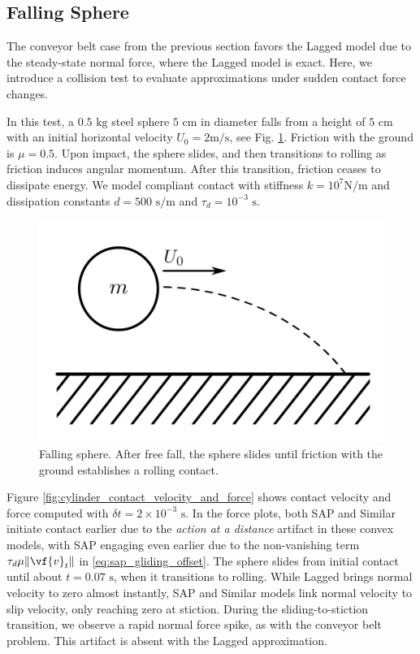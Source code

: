 \subsection{Falling Sphere}
\label{sec:falling_sphere}

The conveyor belt case from the previous section favors the Lagged model due to
the steady-state normal force, where the Lagged model is exact. Here, we
introduce a collision test to evaluate approximations under sudden contact
force changes.

In this test, a $0.5\text{ kg}$ steel sphere $5\text{ cm}$ in diameter falls
from a height of $5\text{ cm}$ with an initial horizontal velocity $U_0=2\text{
m/s}$, see Fig. \ref{fig:sphere_schematic}. Friction with the ground is
$\mu=0.5$. Upon impact, the sphere slides, and then transitions to rolling
as friction induces angular momentum. After this transition, friction ceases to
dissipate energy. We model compliant contact with stiffness $k=10^{7}\text{
N/m}$ and dissipation constants $d=500\text{ s/m}$ and
$\tau_d=10^{-3}\text{ s}$.

\begin{figure}[!h]
    \centering
    \includegraphics[width=0.6\columnwidth]{figures/TestCases/Cylinder/sphere_schematic.png}
    \caption{Falling sphere. After free fall, the sphere slides until friction with the ground establishes a rolling contact.}
    \label{fig:sphere_schematic}
\end{figure}

Figure \ref{fig:cylinder_contact_velocity_and_force} shows contact velocity and
force computed with $\delta t=2\times10^{-3}\text{ s}$. In the force plots, both
SAP and Similar initiate contact earlier due to the \emph{action at a distance}
artifact in these convex models, with SAP engaging even earlier due to the
non-vanishing term $\tau_d\mu\Vert\vf{v}_t\Vert$ in
\eqref{eq:sap_gliding_offset}. The sphere slides from initial contact until
about $t=0.07\text{ s}$, when it transitions to rolling. While Lagged brings
normal velocity to zero almost instantly, SAP and Similar models link normal
velocity to slip velocity, only reaching zero at stiction. During the
sliding-to-stiction transition, we observe a rapid normal force spike, as with
the conveyor belt problem. This artifact is absent with the Lagged
approximation.


